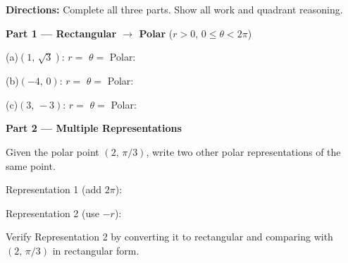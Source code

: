 \documentclass[10pt]{article}
\begin{document}
\begin{tcolorbox}[colback=white, colframe=black!40,
    title=\textbf{Tier A --- Apply},
    fonttitle=\bfseries, arc=2mm, left=3mm, right=3mm, top=2mm, bottom=2mm]

\textbf{Directions:} Complete all three parts. Show all work and quadrant reasoning.

\vspace{6pt}
\textbf{Part 1 --- Rectangular $\to$ Polar} ($r > 0$, $0 \le \theta < 2\pi$)

\vspace{4pt}
(a)\quad $(1,\, \sqrt{3})$: \quad $r = $ \underline{\hspace{1.8cm}} \quad
$\theta = $ \underline{\hspace{1.8cm}} \quad Polar: \underline{\hspace{2.5cm}}

\vspace{6pt}
(b)\quad $(-4,\, 0)$: \quad $r = $ \underline{\hspace{1.8cm}} \quad
$\theta = $ \underline{\hspace{1.8cm}} \quad Polar: \underline{\hspace{2.5cm}}

\vspace{6pt}
(c)\quad $(3,\, -3)$: \quad $r = $ \underline{\hspace{1.8cm}} \quad
$\theta = $ \underline{\hspace{1.8cm}} \quad Polar: \underline{\hspace{2.5cm}}

\vspace{10pt}
\textbf{Part 2 --- Multiple Representations}

Given the polar point $(2,\, \pi/3)$, write two other polar representations
of the same point.

\vspace{4pt}
Representation 1 (add $2\pi$): \underline{\hspace{5cm}}

\vspace{4pt}
Representation 2 (use $-r$): \underline{\hspace{5cm}}

\vspace{4pt}
Verify Representation 2 by converting it to rectangular and comparing with
$(2,\, \pi/3)$ in rectangular form.


\end{tcolorbox}
\end{document}
